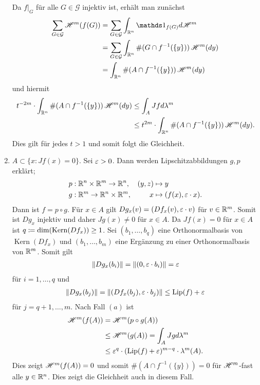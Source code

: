 \documentclass[a4paper,twoside,DIV15,BCOR12mm]{scrbook}
\newcommand{\ind}{\mathds 1}
\newcommand{\HM}{\H}
\DeclareMathOperator{\Lip}{Lip}
\DeclareMathOperator{\Kern}{Kern}
\begin{document}
\begin{beweis}
\begin{enumerate}[{Fall} (a):]
Da $f|_G$ für alle $G\in\mathcal G$ injektiv ist, erhält man zunächst
\begin{align*}
\sum_{G\in\mathcal G} \HM^m(f(G))
&= \sum_{G\in\mathcal G} \int_{\MdR^n} \ind_{f(G)} d\HM^m \\
&= \sum_{G\in\mathcal G} \int_{\MdR^n} \#(G\cap f^{-1}(\{y\}))\, \HM^m(dy) \\
&= \int_{\MdR^n} \#(A\cap f^{-1}(\{y\}))\, \HM^m(dy)
\end{align*}
und hiermit
\begin{align*}
t^{-2m}\cdot \int_{\MdR^n} \#(A\cap f^{-1}(\{y\}))\, \HM^m(dy) 
&\le \int_A Jfd\lambda^m \\
&\le t^{2m} \cdot \int_{\MdR^n} \#(A\cap f^{-1}(\{y\})) \, \HM^m(dy).
\end{align*}
Dies gilt für jedes $t>1$ und somit folgt die Gleichheit.
\item $A\subset \{x: Jf(x) = 0\}$. Sei $\varepsilon>0$. Dann werden Lipschitzabbildungen $g,p$ erklärt;
\begin{align*}
p: {}&\mathbb{R}^n\times\mathbb{R}^m \to\mathbb{R}^n, & (y,z) &\mapsto y \\
g: {}&\mathbb{R}^m\to\mathbb{R}^n\times\mathbb{R}^m,  & x&\mapsto (f(x),\varepsilon\cdot x).
\end{align*}
Dann ist $f= p\circ g$. Für $x\in A$ gilt $Dg_x(v) = (Df_x(v), \varepsilon\cdot v)$ für $v\in\mathbb{R}^m$. Somit ist $Dg_x$ injektiv und daher $Jg(x)\ne 0$ für $x\in A$. Da $Jf(x)=0$ für $x\in A$ ist $q \da \dim(\Kern(Df_x)) \ge 1$.  Sei $(b_1,\ldots,b_q)$ eine Orthonormalbasis von $\Kern(Df_x)$ und $(b_1,\ldots,b_m)$ eine Ergänzung zu einer Orthonormalbasis von $\mathbb{R}^m$. Somit gilt
\begin{align*}
\|Dg_x(b_i)\| = \|(0,\varepsilon \cdot b_i)\| = \varepsilon
\end{align*}
für $i=1,\ldots,q$ und
\begin{align*}
\|Dg_x(b_j)\| = \|(Df_x(b_j),\ep\cdot b_j)\| \le \Lip(f) + \ep
\end{align*}
für $j=q+1,\ldots,m$. Nach Fall $(a)$ ist
\begin{align*}
\HM^m(f(A)) &= \HM^m(p\circ g(A))\\
&\le \HM^m(g(A)) = \int_{A} Jgd\lambda^m\\
&\le \ep^q\cdot(\Lip(f)+\ep)^{m-q}\cdot\lambda^m(A).
\end{align*}
Dies zeigt $\HM^m(f(A))=0$ und somit $\#(A\cap f^{-1}(\{y\})) = 0$ für $\HM^m$-fast alle $y\in\mathbb{R}^n$. Dies zeigt die Gleichheit auch in diesem Fall.
\end{enumerate}
\end{beweis}
\end{document}

